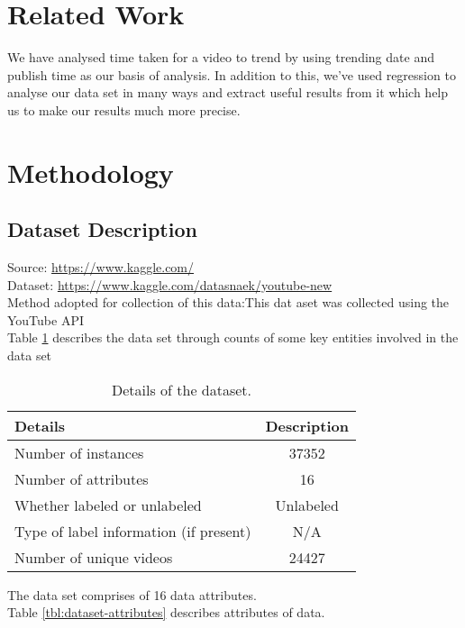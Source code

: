 \documentclass[runningheads]{llncs}
\begin{document}
\section{Related Work}
We have analysed time taken for a video to trend by using trending date and publish time as our basis of analysis. In addition to this, we’ve used regression to analyse our data set in many ways and extract useful results from it which help us to make our results much more precise.

\section{Methodology}

\subsection{Dataset Description}
Source: \url{https://www.kaggle.com/}\\
Dataset: \url{https://www.kaggle.com/datasnaek/youtube-new}\\
Method adopted for collection of this data:This dat aset was collected using the YouTube API\\
Table \ref{tbl:dataset} describes the data set through counts of some key entities involved in the data set\\
\begin{table}[H]
\centering
\begin{tabular}{|l|c|}
\hline
\textbf{Details} &  \textbf{Description}\\
\hline
Number of instances & 37352\\
\hline
Number of attributes & 16\\
\hline
Whether labeled or unlabeled & Unlabeled\\
\hline
Type of label information (if present)& N/A\\
\hline
Number of unique  videos & 24427\\
\hline
\end{tabular}
\caption{Details of the dataset.}
\label{tbl:dataset}
\end{table}
The data set comprises of 16 data attributes.\\  Table \ref{tbl:dataset-attributes} describes attributes of data.
\end{document}
